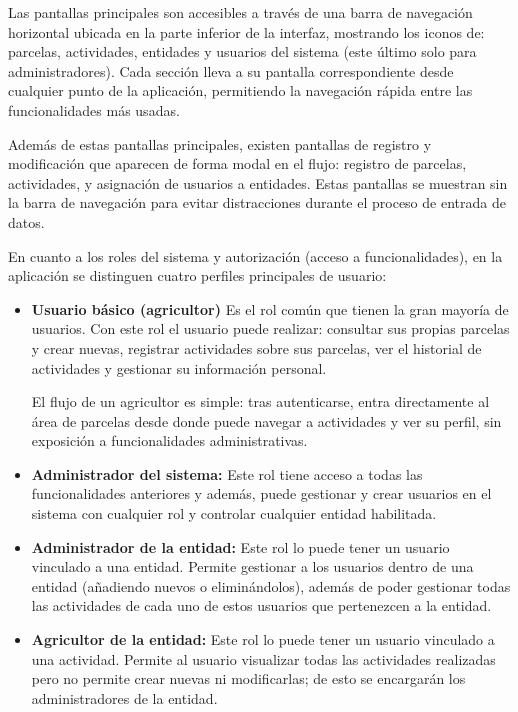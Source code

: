 Las pantallas principales son accesibles a través de una barra de navegación horizontal ubicada en la parte inferior de la interfaz, mostrando los iconos de: parcelas, actividades, entidades y usuarios del
sistema (este último solo para administradores). Cada sección lleva a su pantalla correspondiente desde cualquier punto de la aplicación, permitiendo la navegación rápida entre las funcionalidades más usadas.

Además de estas pantallas principales, existen pantallas de registro y modificación que aparecen de forma modal en el flujo: registro de parcelas, actividades, y asignación de usuarios a entidades. Estas pantallas 
se muestran sin la barra de navegación para evitar distracciones durante el proceso de entrada de datos.

En cuanto a los roles del sistema y autorización (acceso a funcionalidades), en la aplicación se distinguen cuatro perfiles principales de usuario:

\begin{itemize}
    \item \textbf{Usuario básico (agricultor)} \newline
    Es el rol común que tienen la gran mayoría de usuarios. Con este rol el usuario puede realizar: consultar sus propias parcelas y crear nuevas, registrar actividades sobre sus parcelas, ver el historial de actividades 
    y gestionar su información personal. 

    El flujo de un agricultor es simple: tras autenticarse, entra directamente al área de parcelas desde donde puede navegar a actividades y ver su perfil, sin exposición a funcionalidades administrativas.

    \item \textbf{Administrador del sistema:} \newline
    Este rol tiene acceso a todas las funcionalidades anteriores y además, puede gestionar y crear usuarios en el sistema con cualquier rol y controlar cualquier entidad habilitada.

    \item \textbf{Administrador de la entidad:} \newline
    Este rol lo puede tener un usuario vinculado a una entidad. Permite gestionar a los usuarios dentro de una entidad (añadiendo nuevos o eliminándolos), además de poder gestionar todas las actividades de cada uno de estos
    usuarios que pertenezcen a la entidad.

    \item \textbf{Agricultor de la entidad:} \newline
    Este rol lo puede tener un usuario vinculado a una actividad. Permite al usuario visualizar todas las actividades realizadas pero no permite crear nuevas ni modificarlas; de esto se encargarán los administradores de la entidad.
\end{itemize}

